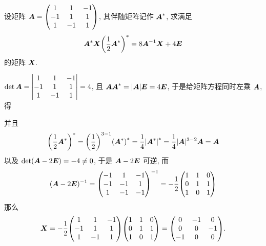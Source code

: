 \begin{example}
    设矩阵 $\vb*{A}=\mqty(1&1&-1\\-1&1&1\\1&-1&1)$, 其伴随矩阵记作 $\vb*{A}^*$, 求满足
    $$\vb*{A}^*\vb*{X}\qty(\dfrac{1}{2}\vb*{A}^*)^*=8\vb*{A}^{-1}\vb*{X}+4\vb*{E}$$ 的矩阵 $\vb*{X}.$
\end{example}
\begin{solution}
    $\det \vb*{A}=\mqty|1&1&-1\\-1&1&1\\1&-1&1|=4$, 且 $\vb*{A}\vb*{A}^*=|\vb*{A}|\vb*{E}=4\vb*{E}$, 于是给矩阵方程同时左乘 $\vb*{A}$, 得
    并且 $$\qty(\dfrac{1}{2}\vb*{A}^*)^*=\qty(\dfrac{1}{2})^{3-1}\qty(\vb*{A}^*)^*=\dfrac{1}{4}\qty|\vb*{A}^*|^*=\dfrac{1}{4}|\vb*{A}|^{3-2}\vb*{A}=\vb*{A}$$ 以及 $\det(\vb*{A}-2\vb*{E})= -4\neq0$, 于是 $\vb*{A}-2\vb*{E}$ 可逆,
    而 $$(\vb*{A}-2\vb*{E})^{-1}=\mqty(-1&1&-1\\-1&-1&1\\1&-1&-1)^{-1}=-\dfrac{1}{2}\mqty(1&1&0\\0&1&1\\1&0&1)$$ 那么
    $$\vb*{X}=-\dfrac{1}{2}\mqty(1&1&-1\\-1&1&1\\1&-1&1)\mqty(1&1&0\\0&1&1\\1&0&1)=\mqty(0&-1&0\\0&0&-1\\-1&0&0).$$
\end{solution}

